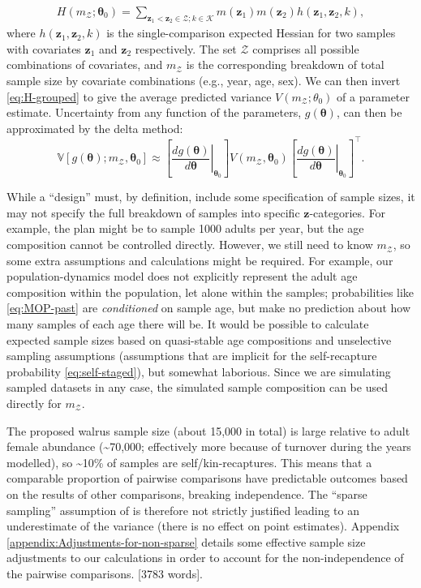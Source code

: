 \begin{gather}
H\left(m_{\mathcal{Z}};\boldsymbol{\theta}_{0}\right)=\sum_{\mathbf{z}_{1}<\mathbf{z}_{2}\in\mathcal{Z};k\in\mathcal{K}}m\left(\mathbf{z}_{1}\right)m\left(\mathbf{z}_{2}\right)h\left(\mathbf{z}_{1},\mathbf{z}_{2},k\right),\label{eq:H-grouped}
\end{gather}
where $h\left(\mathbf{z}_{1},\mathbf{z}_{2},k\right)$ is the single-comparison
expected Hessian for two samples with covariates $\mathbf{z}_{1}$
and $\mathbf{z}_{2}$ respectively. The set $\mathcal{Z}$ comprises
all possible combinations of covariates, and $m_{\mathcal{Z}}$ is
the corresponding breakdown of total sample size by covariate combinations
(e.g., year, age, sex). We can then invert \eqref{eq:H-grouped} to
give the average predicted variance $V\left(m_{\mathcal{Z}};\theta_{0}\right)$
of a parameter estimate. Uncertainty from any function of the parameters,
$g\left(\boldsymbol{\theta}\right)$, can then be approximated by
the delta method:
\[
\mathbb{V}\left[g\left(\boldsymbol{\theta}\right);m_{\mathcal{Z}},\boldsymbol{\theta}_{0}\right]\approx\left[\left.\frac{dg\left(\boldsymbol{\theta}\right)}{d\boldsymbol{\theta}}\right\vert _{\boldsymbol{\theta}_{0}}\right]V\left(m_{\mathcal{Z}},\boldsymbol{\theta}_{0}\right)\left[\left.\frac{dg\left(\boldsymbol{\theta}\right)}{d\boldsymbol{\theta}}\right\vert _{\boldsymbol{\theta}_{0}}\right]^{\top}.
\]

While a ``design'' must, by definition, include some specification
of sample sizes, it may not specify the full breakdown of samples
into specific $\mathbf{z}$-categories. For example, the plan might
be to sample 1000 adults per year, but the age composition cannot
be controlled directly. However, we still need to know $m_{\mathcal{Z}}$,
so some extra assumptions and calculations might be required. For
example, our population-dynamics model does not explicitly represent
the adult age composition within the population, let alone within
the samples; probabilities like \eqref{eq:MOP-past} are \emph{conditioned}
on sample age, but make no prediction about how many samples of each
age there will be. It would be possible to calculate expected sample
sizes based on quasi-stable age compositions and unselective sampling
assumptions (assumptions that are implicit for the self-recapture
probability \eqref{eq:self-staged}), but somewhat laborious. Since
we are simulating sampled datasets in any case, the simulated sample
composition can be used directly for $m_{\mathcal{Z}}$.

The proposed walrus sample size (about 15,000 in total) is large relative
to adult female abundance (\textasciitilde 70,000; effectively more
because of turnover during the years modelled), so \textasciitilde 10\%
of samples are self/kin-recaptures. This means that a comparable proportion
of pairwise comparisons have predictable outcomes based on the results
of other comparisons, breaking independence. The ``sparse sampling''
assumption of \citet{bravington_close-kin_2016} is therefore not
strictly justified leading to an underestimate of the variance (there
is no effect on point estimates). Appendix \ref{appendix:Adjustments-for-non-sparse}
details some effective sample size adjustments to our calculations
in order to account for the non-independence of the pairwise comparisons.
{[}3783 words{]}.
